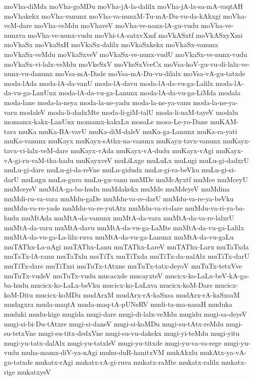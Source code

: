 {moVha-diMda
moVha-goMDu
moVha-jA-la-dalilx
moVha-jA-la-sa-mA-vaqtAH
moVhakekx
moVha-vanunx
moVha-va-nunxM-Tu-mA-Du-vu-da-kAkxgi
moVha-veM-dare
moVha-veMdu
moVhaveV
moVha-ve-nanx-lA-gu-vudu
moVha-ve-nunxva
moVha-ve-nunx-vudu
moVhi-tA-satxvXmf
moVkASxtf
moVkASxyXmi
moVkaSx
moVkaSxH
moVkaSx-dalilx
moVkaSxkekx
moVkaSx-vanunx
moVkaSx-veMdu
moVkaSxveV
moVkaSx-ve-nunx-vudU
moVkaSx-ve-nunx-vudu
moVkaSx-vi-lalx-veMdu
moVkeSxV
moVkeSxVceCx
moVsa-hoV-gu-vu-di-lalx-ve-nunx-vu-danunx
moVsa-mA-Dade
moVsa-mA-Du-vu-dilalx
moVsa-vA-gu-tatxde
moda-lAda
moda-lA-da-vanU
moda-lA-davu
moda-lA-da-vu-ga-Lalilx
moda-lA-da-vu-ga-LanUnx
moda-lA-da-vu-ga-Lanunx
moda-lA-da-vu-ga-LiMda
modala
moda-lane
moda-la-neya
moda-la-ne-yadu
moda-la-ne-ya-vanu
moda-la-ne-ya-varu
modaleV
moda-li-dadxMte
moda-li-giM-talU
moda-li-naM-tayeV
modalu
momamx-kakx-LanUnx
momamx-kakxLu
mosaLe
mosa-Le-yo-Dane
muKAM-tara
muKa
muKa-BA-vavU
muKa-diM-daleV
muKa-ga-Lanunx
muKa-ra-yati
muKa-vanunx
muKayx
muKayx-sAthx-na-vanunx
muKayx-tavx-vanunx
muKayx-tavx-vi-lalx-veM-dare
muKayx-vAda
muKayx-vA-dudu
muKayx-vAgi
muKayx-vA-gi-ru-vaM-tha-hadu
muKayxveV
muLiLxge
muLuLx
muLugi
muLu-gi-dadxrU
muLu-gi-dare
muLu-gi-da-reVne
muLu-gidudx
muLu-gi-ra-beVku
muLu-gi-si-darU
muLugu
muLu-guva
muLu-gu-vanu
muMDe
muMcAyxtf
muMce
muMceyU
muMceyeV
muMdA-ga-ba-hudu
muMdakekx
muMde
muMdeyeV
muMdina
muMdi-ru-va-vara
muMdu-gaDe
muMdu-va-re-darU
muMdu-va-re-ya-beVku
muMdu-va-re-yade
muMdu-va-re-yutAtx
muMdu-va-ri-dare
muMdu-va-ri-ya-ba-hudu
muMtAda
muMtA-da-vanunx
muMtA-da-vara
muMtA-da-va-re-lalxrU
muMtA-da-varu
muMtA-davu
muMtA-da-vu-ga-LaMte
muMtA-da-vu-ga-Lalilx
muMtA-da-vu-ga-La-lilx-ruva
muMtA-da-vu-ga-Lanunx
muMtA-da-vu-gaLu
muTAThx-La-nAgi
muTAThx-Lanu
muTAThx-LareV
muTAThx-Laru
muTaTxda
muTaTx-lA-ranu
muTaTxlu
muTiTx
muTiTxda
muTiTx-da-nalAlx
muTiTx-darU
muTiTx-dare
muTiTxsi
muTuTx-tAtxne
muTuTx-tatx-deyoV
muTuTx-tetxVve
muTuTx-vudeV
muTuTx-vudu
mucacxde
mucayxteV
mucicx-ko-LaLx-beV-kA-ga-ba-hudu
mucicx-ko-LaLx-beVku
mucicx-ko-LuLxva
mucicx-koM-Dare
mucicx-koM-Ditu
mucicx-koMDu
mudArxM
mudArx-rA-kaSxsa
mudArx-rA-kaSxsaM
mudagxra
muda-maqtA
muda-maq-tA-pUNeRV
mudi-ta-ma-nasaH
muduka
muduki
mudu-kige
mugida
mugi-dare
mugi-di-lalx-veMdu
mugidu
mugi-sa-deyeV
mugi-si-bi-Du-tAtxre
mugi-si-daneV
mugi-si-koMDu
mugi-su-tAtx-reMdu
mugi-su-tetxVne
mugi-su-titx-dedxVne
mugi-su-vu-dakekx
mugi-yi-teMdu
mugi-yitu
mugi-yu-tatx-dalAlx
mugi-yu-tatxleV
mugi-yu-titxde
mugi-yu-va-va-rege
mugi-yu-vudu
muha-mamx-diV-ya-nAgi
muhu-duR-hanitxVM
mukAkxlu
mukAtx-ya-vA-gu-tatxde
mukatx-rAgi
mukatx-rA-gi-ruva
mukatx-raMte
mukatx-ralilx
mukatx-rige
mukatxyeV
}
